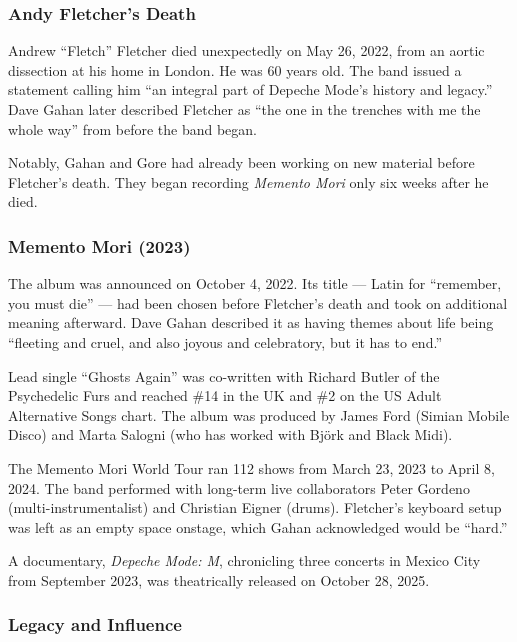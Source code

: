 \documentclass[11pt,letterpaper]{article}
\begin{document}
\subsubsection{Andy Fletcher's Death}

Andrew ``Fletch'' Fletcher died unexpectedly on May 26, 2022, from an aortic dissection at his home in London. He was 60 years old. The band issued a statement calling him ``an integral part of Depeche Mode's history and legacy.'' Dave Gahan later described Fletcher as ``the one in the trenches with me the whole way'' from before the band began.

Notably, Gahan and Gore had already been working on new material before Fletcher's death. They began recording \textit{Memento Mori} only six weeks after he died.

\subsubsection{Memento Mori (2023)}

The album was announced on October 4, 2022. Its title --- Latin for ``remember, you must die'' --- had been chosen before Fletcher's death and took on additional meaning afterward. Dave Gahan described it as having themes about life being ``fleeting and cruel, and also joyous and celebratory, but it has to end.''

Lead single ``Ghosts Again'' was co-written with Richard Butler of the Psychedelic Furs and reached \#14 in the UK and \#2 on the US Adult Alternative Songs chart. The album was produced by James Ford (Simian Mobile Disco) and Marta Salogni (who has worked with Björk and Black Midi).

The Memento Mori World Tour ran 112 shows from March 23, 2023 to April 8, 2024. The band performed with long-term live collaborators Peter Gordeno (multi-instrumentalist) and Christian Eigner (drums). Fletcher's keyboard setup was left as an empty space onstage, which Gahan acknowledged would be ``hard.''

A documentary, \textit{Depeche Mode: M}, chronicling three concerts in Mexico City from September 2023, was theatrically released on October 28, 2025.

\subsubsection{Legacy and Influence}
\end{document}
